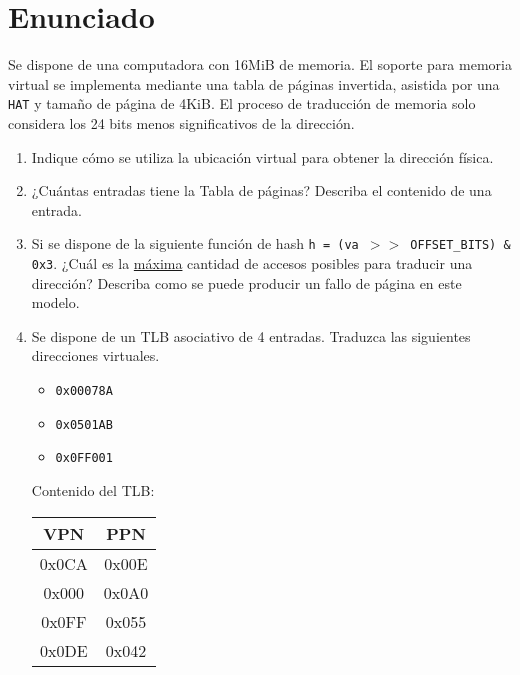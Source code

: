 \documentclass{article}
\begin{document}
\pagestyle{fancyplain}

\cfoot{}
\rfoot{}


\section{Enunciado}
Se dispone de una computadora con 16MiB de memoria. El soporte para memoria virtual se implementa mediante una tabla de páginas invertida, asistida por una \texttt{HAT} y tamaño de página de  4KiB. El proceso de traducción de memoria solo considera los 24 bits menos significativos de la dirección.

\begin{enumerate}
    \item Indique cómo se utiliza la ubicación virtual para obtener la dirección física.
    \item ¿Cuántas entradas tiene la Tabla de páginas? Describa el contenido de una entrada.
    \item Si se dispone de la siguiente función de hash \texttt{h = (va $>>$ OFFSET\_BITS) \& 0x3}. ¿Cuál es la \underline{máxima} cantidad de accesos posibles para traducir una dirección? Describa como se puede producir un fallo de página en este modelo.
    \item Se dispone de un TLB asociativo de 4 entradas. Traduzca las siguientes direcciones virtuales.
    
    \begin{itemize}
        \item \texttt{0x00078A}
        \item \texttt{0x0501AB}
        \item \texttt{0x0FF001}
    \end{itemize}
    
    Contenido del TLB:
    \begin{center}
    \begin{tabular}{|c|c|}
    \hline
        VPN & PPN   \\
        \hline
        0x0CA & 0x00E \\
        0x000 & 0x0A0 \\
        0x0FF & 0x055 \\
        0x0DE & 0x042 \\
        \hline
    \end{tabular}
    \end{center}
\end{enumerate}
\end{document}
